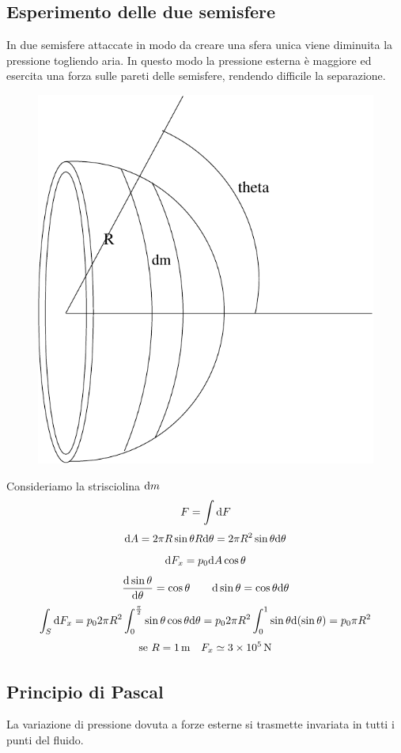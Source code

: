 \subsection{Esperimento delle due semisfere}
In due semisfere attaccate in modo da creare una sfera unica viene diminuita la pressione togliendo aria. In questo modo la pressione esterna è maggiore ed esercita una forza sulle pareti delle semisfere, rendendo difficile la separazione.
\begin{figure}[htbp]
   \centering
   \includegraphics[scale=0.5]{immagini/fisica1/Sfera_pressione}
\end{figure}

Consideriamo la strisciolina $\mathrm{d} m$
\[F=\int\mathrm{d} F\]
\[\mathrm{d} A=2\pi R\sin\theta R\mathrm{d}\theta=2\pi R^2\sin\theta\mathrm{d}\theta\]
\[\mathrm{d} F_x=p_0 \mathrm{d} A\cos\theta\]
\[\frac{\mathrm{d} \sin\theta}{\mathrm{d} \theta}=\cos\theta\qquad\mathrm{d}\sin\theta=\cos\theta\mathrm{d}\theta\]
\[\int_S \mathrm{d} F_x=p_0 2\pi R^2\int_0^{\frac{\pi}{2}}\sin\theta\cos\theta\mathrm{d}\theta=p_0 2\pi R^2\int_0^{1}\sin\theta\mathrm{d}(\sin\theta)=p_0\pi R^2\]
\[\text{se } R=\SI{1}{\metre} \quad F_x\simeq\SI{3E5}{\newton} \]

\subsection{Principio di Pascal}
\begin{Pri}[Pascal]
   La variazione di pressione dovuta a forze esterne si trasmette invariata in tutti i punti del fluido.
\end{Pri}

